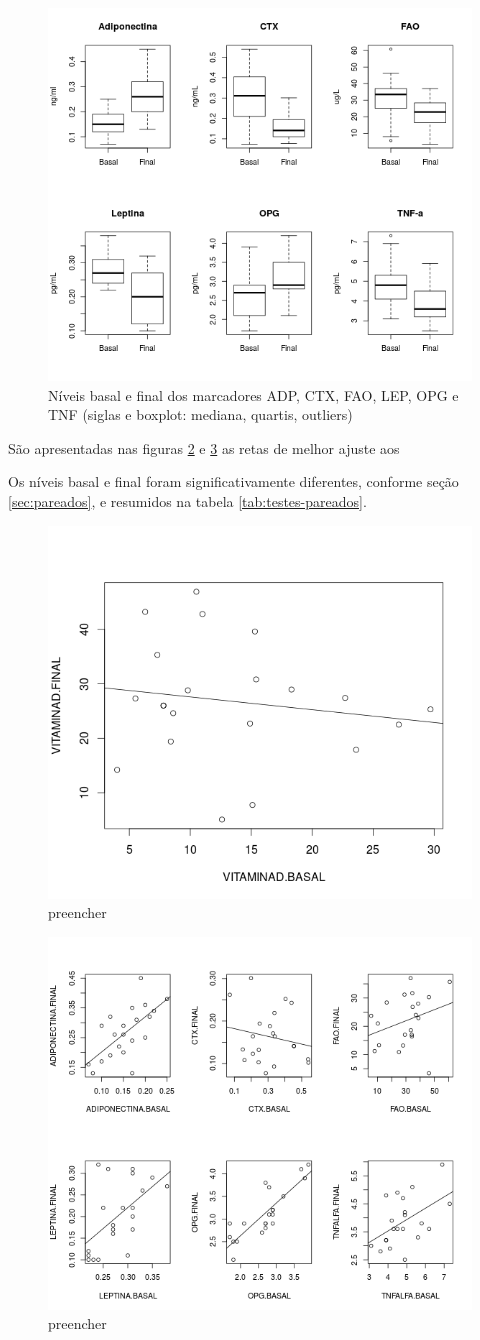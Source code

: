 \documentclass[a4paper]{article}
\begin{document}
\begin{figure}[!h]
  \centering
  \includegraphics[width=.5\textwidth]{../figuras/boxplots}
  \caption[Níveis basal e final dos marcadores ADP, CTX, FAO, LEP, OPG e TNF]{Níveis basal e final dos marcadores ADP, CTX, FAO, LEP, OPG e TNF (siglas e boxplot: mediana, quartis, outliers)}
  \label{fig:marcadores-boxplot}
\end{figure}

São apresentadas nas figuras \ref{fig:vitd-scatter} e \ref{fig:marcadores-scatter} as retas de melhor ajuste aos 

Os níveis basal e final foram significativamente diferentes, conforme seção \ref{sec:pareados}, e resumidos na tabela \ref{tab:testes-pareados}.


\begin{figure}[!h]
  \centering
  \includegraphics[width=.5\textwidth]{../figuras/vitd-scatter}
  \caption{preencher}
  \label{fig:vitd-scatter}
\end{figure}

\begin{figure}[!h]
  \centering
  \includegraphics[width=.5\textwidth]{../figuras/scatterplots}
  \caption{preencher}
  \label{fig:marcadores-scatter}
\end{figure}
\end{document}
